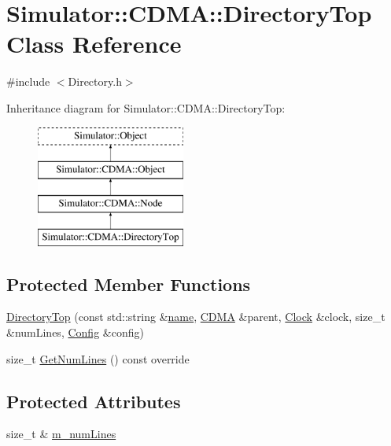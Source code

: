 \hypertarget{class_simulator_1_1_c_d_m_a_1_1_directory_top}{\section{Simulator\+:\+:C\+D\+M\+A\+:\+:Directory\+Top Class Reference}
\label{class_simulator_1_1_c_d_m_a_1_1_directory_top}
}


{\ttfamily \#include $<$Directory.\+h$>$}

Inheritance diagram for Simulator\+:\+:C\+D\+M\+A\+:\+:Directory\+Top\+:\begin{figure}[H]
\begin{center}
\leavevmode
\includegraphics[height=4.000000cm]{class_simulator_1_1_c_d_m_a_1_1_directory_top}
\end{center}
\end{figure}
\subsection*{Protected Member Functions}
\begin{DoxyCompactItemize}
\item 
\hyperlink{class_simulator_1_1_c_d_m_a_1_1_directory_top_af0c67b746e5a3905727e07c8d53a0743}{Directory\+Top} (const std\+::string \&\hyperlink{mtconf_8c_a8f8f80d37794cde9472343e4487ba3eb}{name}, \hyperlink{class_simulator_1_1_c_d_m_a}{C\+D\+M\+A} \&parent, \hyperlink{class_simulator_1_1_clock}{Clock} \&clock, size\+\_\+t \&num\+Lines, \hyperlink{class_config}{Config} \&config)
\item 
size\+\_\+t \hyperlink{class_simulator_1_1_c_d_m_a_1_1_directory_top_aea344573b6853d94f7d53f868ca2b7f2}{Get\+Num\+Lines} () const override
\end{DoxyCompactItemize}
\subsection*{Protected Attributes}
\begin{DoxyCompactItemize}
\item 
size\+\_\+t \& \hyperlink{class_simulator_1_1_c_d_m_a_1_1_directory_top_a4ebb4b89468d17f4984f9f4c44eb9cb1}{m\+\_\+num\+Lines}
\end{DoxyCompactItemize}

